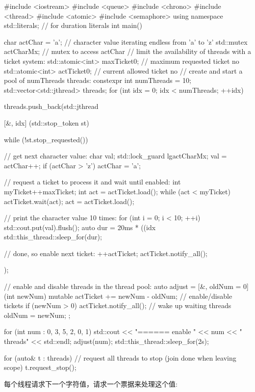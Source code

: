 \begin{cpp}
#include <iostream>
#include <queue>
#include <chrono>
#include <thread>
#include <atomic>
#include <semaphore>
using namespace std::literals; // for duration literals
int main()
{
	char actChar = 'a'; // character value iterating endless from 'a' to 'z'
	std::mutex actCharMx; // mutex to access actChar
	// limit the availability of threads with a ticket system:
	std::atomic<int> maxTicket{0}; // maximum requested ticket no
	std::atomic<int> actTicket{0}; // current allowed ticket no
	// create and start a pool of numThreads threads:
	constexpr int numThreads = 10;
	std::vector<std::jthread> threads;
	for (int idx = 0; idx < numThreads; ++idx) {
		threads.push_back(std::jthread{[&, idx] (std::stop_token st) {
										while (!st.stop_requested()) {
											// get next character value:
											char val;
											{
												std::lock_guard lg{actCharMx};
												val = actChar++;
												if (actChar > 'z') actChar = 'a';
												}

												// request a ticket to process it and wait until enabled:
												int myTicket{++maxTicket};
												int act = actTicket.load();
												while (act < myTicket) {
												actTicket.wait(act);
												act = actTicket.load();
												}

												// print the character value 10 times:
												for (int i = 0; i < 10; ++i) {
												std::cout.put(val).flush();
												auto dur = 20ms * ((idx %
												std::this_thread::sleep_for(dur);
												}

												// done, so enable next ticket:
												++actTicket;
												actTicket.notify_all();
											}
										}});
	}

	// enable and disable threads in the thread pool:
	auto adjust = [&, oldNum = 0] (int newNum) mutable {
					actTicket += newNum - oldNum; // enable/disable tickets
					if (newNum > 0) actTicket.notify_all(); // wake up waiting threads
					oldNum = newNum;
					};

	for (int num : {0, 3, 5, 2, 0, 1}) {
		std::cout << "\n====== enable " << num << " threads" << std::endl;
		adjust(num);
		std::this_thread::sleep_for(2s);
	}

	for (auto& t : threads) { // request all threads to stop (join done when leaving scope)
		t.request_stop();
	}
}
\end{cpp}

每个线程请求下一个字符值，请求一个票据来处理这个值:


